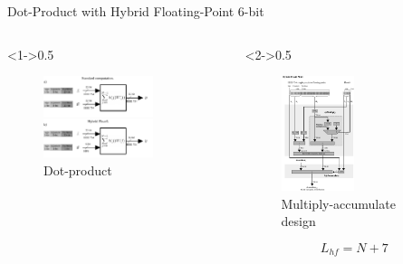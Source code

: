 \begin{frame}{Dot-Product with Hybrid Floating-Point 6-bit}
	\begin{columns}[c] %
		
		\begin{column}<1->{0.5\textwidth}\centering
			\begin{figure}
				\includegraphics[width=0.75\textwidth]{../chapters/cnn_accelerator/figures/dot-product_unit.pdf} %
				\caption{\scriptsize Dot-product}
			\end{figure}
		\end{column}
		
		\begin{column}<2->{0.5\textwidth}
			\begin{figure}
				\includegraphics[width=0.5\textwidth]{../chapters/cnn_accelerator/figures/multiplier.pdf} %
				\caption{Multiply-accumulate design}
			\end{figure}
		\scriptsize
		\[ L_{hf}=N+7 \]
		\end{column}
		
	\end{columns}
\end{frame}

